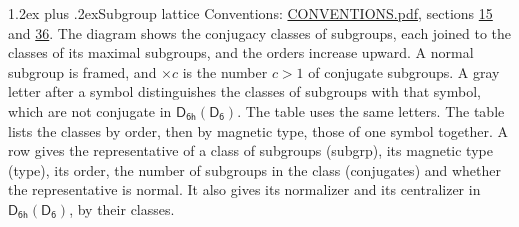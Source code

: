 \documentclass[10pt,a4paper]{article}
\makeatletter
\renewcommand\section{\@startsection{section}{1}{\z@}{-3ex plus -1ex minus -.2ex}%
  {1.2ex plus .2ex}{\normalfont\large\sffamily\bfseries\color{parttitle}}}
\numberwithin{equation}{section}
\newcommand{\grp}[1]{\mathsf{#1}}
\makeatother
\begin{document}
\section{Subgroup lattice}\label{s:subgroups}
Conventions: \href{../../CONVENTIONS.pdf}{CONVENTIONS.pdf}, sections \href{../../../rotation/CONVENTIONS.pdf\#conv.15}{15} and \href{../../CONVENTIONS.pdf\#conv.36}{36}.
The diagram shows the conjugacy classes of subgroups, each joined to the classes of its maximal subgroups, and the orders increase upward. \label{n:index.conjugates.c}\label{n:mark.conjugates}A normal subgroup is framed, and ${\times}c$ is the number $c > 1$ of conjugate subgroups. \label{n:mark.letter}A gray letter after a symbol distinguishes the classes of subgroups with that symbol, which are not conjugate in $\grp{D_{6h}}(\grp{D_{6}})$. The table uses the same letters. The table lists the classes by order, then by magnetic type, those of one symbol together. \label{n:head.subgroup}\label{n:head.magnetic.type}\label{n:head.order}\label{n:head.conjugates}\label{n:head.normal}A row gives the representative of a class of subgroups (subgrp), its magnetic type (type), its order, the number of subgroups in the class (conjugates) and whether the representative is normal. \label{n:head.normalizer}\label{n:head.centralizer}It also gives its normalizer and its centralizer in $\grp{D_{6h}}(\grp{D_{6}})$, by their classes. 
\end{document}
